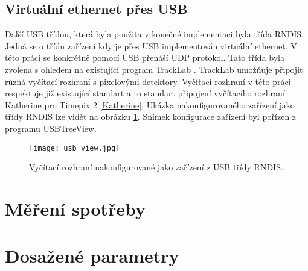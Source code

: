 \subsection{Virtuální ethernet přes USB}
	Další USB třídou, která byla použita v konečné implementaci byla třída RNDIS. Jedná se o třídu zařízení kdy je přes USB implementován virtuální ethernet. V této práci se konkrétně pomocí USB přenáší UDP protokol. Tato třída byla zvolena s ohledem na existující program TrackLab \cite{TrackLab}. TrackLab umožňuje připojit různá vyčítací rozhraní s pixelovými detektory. Vyčítací rozhraní v této práci respektuje již existující standart a to standart připojení vyčítacího rozhraní Katherine pro Timepix 2 \ref{Katherine}. Ukázka nakonfigurovaného zařízení jako třídy RNDIS lze vidět na obrázku \ref{fig:RNDIS}. Snímek konfigurace zařízení byl pořízen z programu USBTreeView. 
	\begin{figure}[h!]
		\centering
		\captionsetup{justification=centering}
		\texttt{[image: usb\_view.jpg]}
		\caption{Vyčítací rozhraní nakonfigurované jako zařízení z USB třídy RNDIS.} 
		\label{fig:RNDIS}
	\end{figure}
	

\section{Měření spotřeby}

	
\section{Dosažené parametry}


